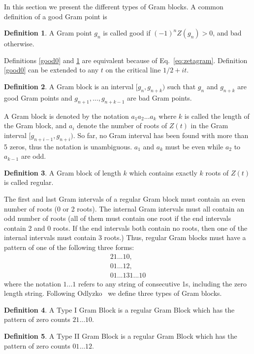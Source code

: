 \documentclass[twoside]{article}
\theoremstyle{definition}
\newtheorem{defn}{Definition}
\begin{document}
In this section we present the different types of Gram blocks. A common definition of a good Gram point is
\begin{defn}\label{good1}
A Gram point $g_n$ is called good if $(-1)^nZ(g_n) > 0$, and bad otherwise.
\end{defn}
Definitions \ref{good0} and \ref{good1} are equivalent because of Eq.~\ref{eq:zetagram}. Definition \ref{good0}  can be extended to any {$t$} on the critical line $1/2+it$. 
{
\begin{defn}\label{gramblock}
A Gram block is an interval $[g_n, g_{n+k})$ such that $g_n$  and $g_{n+k}$ are good Gram points 
and $g_{n+1}, . . ., g_{n+k-1}$ are bad Gram points. 
\end{defn}
}
A Gram block is denoted by the notation $a_1a_2 . . . a_k$ where $k$ is called the length of the Gram block, and $a_i$ denote the number of roots of $Z(t)$ in the Gram interval $[g_{n+i-1}, g_{n+i})$. So far, no Gram interval has been found with more than 5 zeros, thus the notation is unambiguous. $a_1$ and $a_k$ must be even while  $a_2$ to $a_{k-1}$ are odd.
{
\begin{defn}\label{regulargramblock}
A Gram block of length $k$ which contains exactly $k$ roots of {$Z(t)$} is called regular. 
\end{defn}
}
The first and last Gram intervals of a regular Gram block must contain an even number of roots (0 or 2 roots). 
The internal Gram intervals must all contain an odd number of roots (all of them must contain one root if the end intervals contain 2 and 0 roots. If the end intervals both contain no roots, then one of the internal intervals must contain 3 roots.) 
Thus, regular Gram blocks must have a pattern of one of the following three forms:
\begin{eqnarray}
21 . . . 10,\nonumber\\
 01 . . . 12,\nonumber \\
 01 . . . 131 . . . 10
\label{types}
\end{eqnarray}
where the notation $1 . . . 1$ refers to any string of consecutive 1s, including the zero length string. 
Following Odlyzko~\cite{Odlyzko 1992} we define three types of Gram blocks.  
{
\begin{defn}\label{gramblockI}
A Type I Gram Block is a regular Gram Block which has the pattern of zero counts $21...10$.
\end{defn}
}
{
\begin{defn}\label{gramblockII}
A Type II Gram Block is a regular Gram Block which has the pattern of zero counts $01 . . . 12$.
\end{defn}
}
\end{document}
